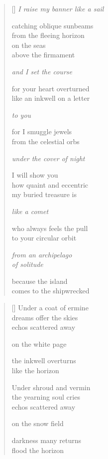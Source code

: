 \documentclass[12pt,a4paper]{article}
\begin{document}

\newpage

\poemtitle{}

\settowidth{\versewidth}{I raise my banner like a sail}

\bigskip

\begin{verse}[\versewidth]
  \emph{I raise my banner like a sail}

  catching oblique sunbeams \\
  from the fleeing horizon \\
  on the seas \\
  above the firmament

  \emph{and I set the course}

  for your heart overturned \\
  like an inkwell on a letter

  \emph{to you}

  for I smuggle jewels \\
  from the celestial orbs

  \emph{under the cover of night}

  I will show you \\
  how quaint and eccentric \\
  my buried treasure is

  \emph{like a comet}

  who always feels the pull \\
  to your circular orbit

  \emph{from an archipelago \\
  of solitude}

  because the island \\
  comes to the shipwrecked
\end{verse}


\newpage

\poemtitle{}

\settowidth{\versewidth}{Under shroud and vermin}

\bigskip

\begin{verse}[\versewidth]
  Under a coat of ermine \\
  dreams offer the skies \\
  echos scattered away

  on the white page

  the inkwell overturns \\
  like the horizon

  Under shroud and vermin \\
  the yearning soul cries \\
  echos scattered away

  on the snow field

  darkness many returns \\
  flood the horizon
\end{verse}
\end{document}
